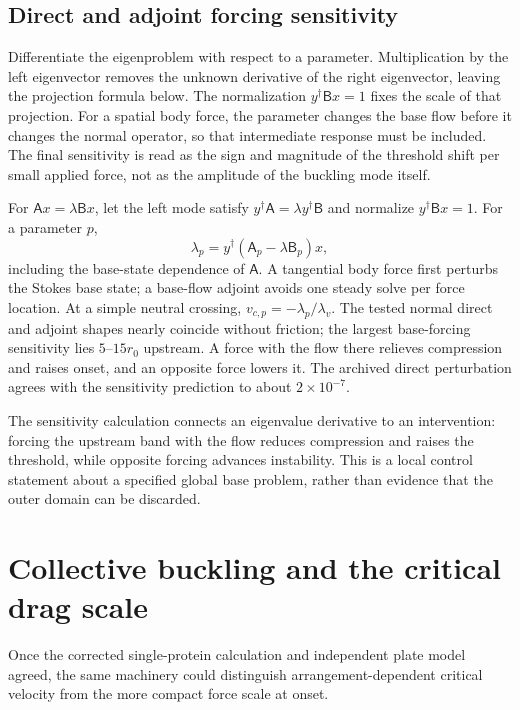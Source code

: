 \subsection{Direct and adjoint forcing sensitivity}


Differentiate the eigenproblem with respect to a parameter. Multiplication by the left eigenvector removes the unknown derivative of the right eigenvector, leaving the projection formula below. The normalization $y^\dagger\mathsf Bx=1$ fixes the scale of that projection. For a spatial body force, the parameter changes the base flow before it changes the normal operator, so that intermediate response must be included. The final sensitivity is read as the sign and magnitude of the threshold shift per small applied force, not as the amplitude of the buckling mode itself.


For $\mathsf A x=\lambda\mathsf Bx$, let the left mode satisfy $y^\dagger\mathsf A=\lambda y^\dagger\mathsf B$ and normalize $y^\dagger\mathsf Bx=1$. For a parameter $p$,
\begin{equation}
\lambda_p=y^\dagger(\mathsf A_p-\lambda\mathsf B_p)x,
\end{equation}
including the base-state dependence of $\mathsf A$. A tangential body force first perturbs the Stokes base state; a base-flow adjoint avoids one steady solve per force location. At a simple neutral crossing, $v_{c,p}=-\lambda_p/\lambda_v$. The tested normal direct and adjoint shapes nearly coincide without friction; the largest base-forcing sensitivity lies $5$--$15r_0$ upstream. A force with the flow there relieves compression and raises onset, and an opposite force lowers it. The archived direct perturbation agrees with the sensitivity prediction to about $2\times10^{-7}$.




The sensitivity calculation connects an eigenvalue derivative to an intervention: forcing the upstream band with the flow reduces compression and raises the threshold, while opposite forcing advances instability. This is a local control statement about a specified global base problem, rather than evidence that the outer domain can be discarded.


\section{Collective buckling and the critical drag scale}\label{sec:multi}
Once the corrected single-protein calculation and independent plate model agreed, the same machinery could distinguish arrangement-dependent critical velocity from the more compact force scale at onset.


